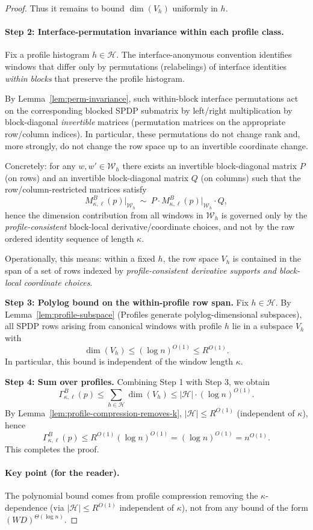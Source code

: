 \documentclass[12pt]{article}
\theoremstyle{definition}
\theoremstyle{definition}
\theoremstyle{remark}
\theoremstyle{remark}
\begin{document}
\begin{proof}
Thus it remains to bound $\dim(V_h)$ uniformly in $h$.

\paragraph{Step 2: Interface-permutation invariance within each profile class.}
Fix a profile histogram $h\in\mathcal{H}$.  The interface-anonymous convention identifies
windows that differ only by permutations (relabelings) of interface identities \emph{within
blocks} that preserve the profile histogram.

By Lemma~\ref{lem:perm-invariance},
such within-block interface permutations act on the corresponding blocked SPDP submatrix
by left/right multiplication by block-diagonal \emph{invertible} matrices (permutation
matrices on the appropriate row/column indices).  In particular, these permutations do not
change rank and, more strongly, do not change the row space up to an invertible coordinate
change.

Concretely: for any $w,w'\in\mathcal{W}_h$ there exists an invertible block-diagonal matrix
$P$ (on rows) and an invertible block-diagonal matrix $Q$ (on columns) such that the
row/column-restricted matrices satisfy
\[
M^B_{\kappa,\ell}(p)\big|_{\mathcal{W}_h}
\ \sim\ P\cdot M^B_{\kappa,\ell}(p)\big|_{\mathcal{W}_h}\cdot Q,
\]
hence the dimension contribution from all windows in $\mathcal{W}_h$ is governed only by
the \emph{profile-consistent} block-local derivative/coordinate choices, and not by the raw
ordered identity sequence of length $\kappa$.

Operationally, this means: within a fixed $h$, the row space $V_h$ is contained in the span
of a set of rows indexed by \emph{profile-consistent derivative supports and block-local
coordinate choices}.

\textbf{Step 3: Polylog bound on the within-profile row span.}
Fix $h\in\mathcal{H}$. By Lemma~\ref{lem:profile-subspace} (Profiles generate polylog-dimensional subspaces),
all SPDP rows arising from canonical windows with profile $h$ lie in a subspace
$V_h$ with
\[
\dim(V_h)\le (\log n)^{O(1)} \le R^{O(1)}.
\]
In particular, this bound is independent of the window length $\kappa$.

\textbf{Step 4: Sum over profiles.}
Combining Step 1 with Step 3, we obtain
\[
\Gamma^B_{\kappa,\ell}(p)
\le \sum_{h\in\mathcal{H}}\dim(V_h)
\le |\mathcal{H}|\cdot (\log n)^{O(1)}.
\]
By Lemma~\ref{lem:profile-compression-removes-k}, $|\mathcal{H}|\le R^{O(1)}$ (independent of $\kappa$), hence
\[
\Gamma^B_{\kappa,\ell}(p)\le R^{O(1)}(\log n)^{O(1)} = (\log n)^{O(1)} = n^{O(1)}.
\]
This completes the proof.

\paragraph{Key point (for the reader).}
The polynomial bound comes from profile compression removing the $\kappa$-dependence (via
$|\mathcal{H}|\le R^{O(1)}$ independent of $\kappa$), not from any bound of the form
$(WD)^{\Theta(\log n)}$.
\end{proof}
\end{document}
